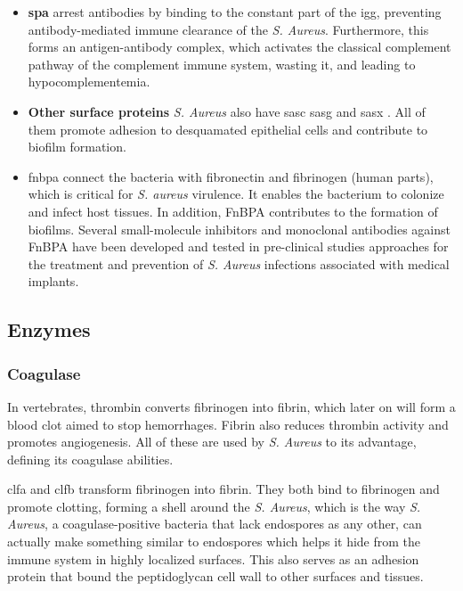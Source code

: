 \begin{itemize}

    \label{stephCellWallSPA}
    \item \textbf{\gls{spa}} arrest antibodies by binding to the constant part of the \gls{igg}, preventing antibody-mediated immune clearance of the \textit{S. Aureus}. Furthermore, this forms an antigen-antibody complex, which activates the classical complement pathway of the complement immune system, wasting it, and leading to hypocomplementemia.

    \item \textbf{Other surface proteins} \textit{S. Aureus} also have \gls{sasc} \cite{Foster2013} \gls{sasg} \cite{Cheng2009} and \gls{sasx} \cite{Josefsson2001}. All of them promote adhesion to desquamated epithelial cells and contribute to biofilm formation.
    
    \item \gls{fnbpa} connect the bacteria with fibronectin and fibrinogen (human parts), which is critical for \textit{S. aureus} virulence. It enables the bacterium to colonize and infect host tissues. In addition, FnBPA contributes to the formation of biofilms. Several small-molecule inhibitors and monoclonal antibodies against FnBPA have been developed and tested in pre-clinical studies approaches for the treatment and prevention of \textit{S. Aureus} infections associated with medical implants.

\end{itemize}

\subsection{Enzymes}

\subsubsection{Coagulase}
\label{stahp:coagulase}

In vertebrates, thrombin converts fibrinogen into fibrin, which later on will form a blood clot aimed to stop hemorrhages. Fibrin also reduces thrombin activity and promotes angiogenesis. All of these are used by \textit{S. Aureus} to its advantage, defining its coagulase abilities.

\gls{clfa} and \gls{clfb} transform fibrinogen into fibrin. They both bind to fibrinogen and promote clotting, forming a shell around the \textit{S. Aureus}, which is the way \textit{S. Aureus}, a coagulase-positive bacteria that lack endospores as any other, can actually make something similar to endospores which helps it hide from the immune system in highly localized surfaces. This also serves as an adhesion protein that bound the peptidoglycan cell wall to other surfaces and tissues.

